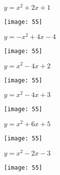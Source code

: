 \documentclass[a4paper]{oblivoir}
\begin{document}
\clearpage
\begin{minipage}{0.45\textwidth}\centering
\(y=x^2+2x+1\)
\par\bigskip\texttt{[image: 55]}
\end{minipage}
\begin{minipage}{0.45\textwidth}\centering
\(y=-x^2+4x-4\)
\par\bigskip\texttt{[image: 55]}
\end{minipage}\bigskip\bigskip\par
\begin{minipage}{0.45\textwidth}\centering
\(y=x^2-4x+2\)
\par\bigskip\texttt{[image: 55]}
\end{minipage}
\begin{minipage}{0.45\textwidth}\centering
\(y=x^2-4x+3\)
\par\bigskip\texttt{[image: 55]}
\end{minipage}\bigskip\bigskip\par
\begin{minipage}{0.45\textwidth}\centering
\(y=x^2+6x+5\)
\par\bigskip\texttt{[image: 55]}
\end{minipage}
\begin{minipage}{0.45\textwidth}\centering
\(y=x^2-2x-3\)
\par\bigskip\texttt{[image: 55]}
\end{minipage}\bigskip\bigskip\par
\end{document}
